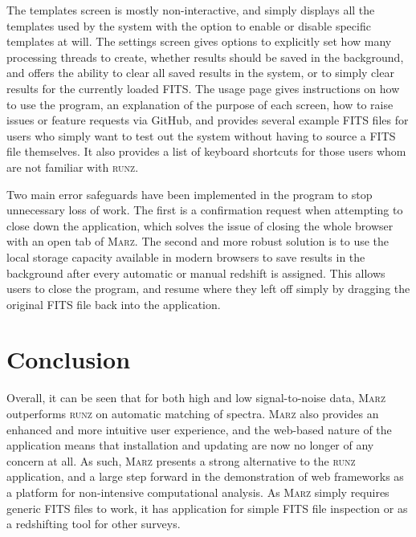\documentclass[iop]{emulateapj}
\newcommand{\runz}{\textsc{runz}}
\newcommand{\marz}{\textsc{Marz}}
\begin{document}
The templates screen is mostly non-interactive, and simply displays all the templates used by the system with the option to enable or disable specific templates at will. The settings screen gives options to explicitly set how many processing threads to create, whether results should be saved in the background, and offers the ability to clear all saved results in the system, or to simply clear results for the currently loaded FITS. The usage page gives instructions on how to use the program, an explanation of the purpose of each screen, how to raise issues or feature requests via GitHub, and provides several example FITS files for users who simply want to test out the system without having to source a FITS file themselves. It also provides a list of keyboard shortcuts for those users whom are not familiar with \runz{}.

Two main error safeguards have been implemented in the program to stop unnecessary loss of work. The first is a confirmation request when attempting to close down the application, which solves the issue of closing the whole browser with an open tab of \marz{}. The second and more robust solution is to use the local storage capacity available in modern browsers to save results in the background after every automatic or manual redshift is assigned. This allows users to close the program, and resume where they left off simply by dragging the original FITS file back into the application.













\section{Conclusion}

Overall, it can be seen that for both high and low signal-to-noise data, \marz{} outperforms \runz{} on automatic matching of spectra. \marz{} also provides an enhanced and more intuitive user experience, and the web-based nature of the application means that installation and updating are now no longer of any concern at all. As such, \marz{} presents a strong alternative to the \runz{} application, and a large step forward in the demonstration of web frameworks as a platform for non-intensive computational analysis. As \marz{} simply requires generic FITS files to work, it has application for simple FITS file inspection or as a redshifting tool for other surveys.
\end{document}
